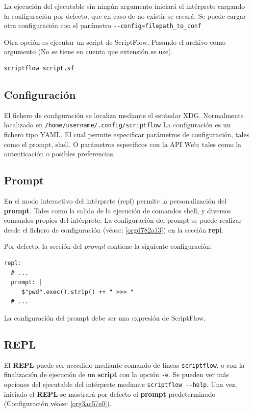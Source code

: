 \documentclass[11pt]{article}
\begin{document}
La ejecución del ejecutable sin ningún argumento iniciará el intérprete cargando la configuración por defecto, que en caso de no existir se creará.
Se puede cargar otra configuración con el parámetro \texttt{-{}-config=filepath\_to\_conf}

Otra opción es ejecutar un script de ScriptFlow. Pasando el archivo como argumento (No se tiene en cuenta que extensión se use).
\begin{verbatim}
scriptflow script.sf
\end{verbatim}

\subsection{Configuración}
\label{sec:org9985fa5}

\label{orgd782a13}
El fichero de configuración se localiza mediante el
estándar XDG. Normalmente localizado en \texttt{/home/username/.config/scriptflow}
La configuración es un fichero tipo YAML. El cual permite especificar
parámetros de configuración, tales como el prompt, shell. O parámetros
específicos con la API Web; tales como la autenticación o posibles
preferencias.

\subsection{Prompt}
\label{sec:orgdcb234d}

\label{org3ac57e0}
En el modo interactivo del intérprete (repl) permite la personalización del
\textbf{prompt}. Tales como la salida de la ejecución de comandos
shell, y diversos comandos propios del intérprete. La configuración del
prompt se puede realizar desde el fichero de configuración (véase:
\ref{orgd782a13}) en la sección \textbf{repl}.

Por defecto, la sección del \emph{prompt} contiene la siguiente configuración:

\begin{verbatim}
repl:
  # ...
  prompt: |
     $"pwd".exec().strip() ++ " >>> "
  # ...
\end{verbatim}

La configuración del prompt debe ser una expresión de ScriptFlow.

\subsection{REPL}
\label{sec:org52ceaf6}
El \textbf{REPL} puede ser accedido mediante comando de líneas \texttt{scriptflow}, o con la
finalización de ejecución de un \textbf{script} con la opción \texttt{-e}. Se pueden ver más opciones del
ejecutable del intérprete mediante \texttt{scriptflow -{}-help}. Una vez,
iniciado el \textbf{REPL} se mostrará por defecto el \textbf{prompt} predeterminado
(Configuración véase: \ref{org3ac57e0}).
\end{document}
